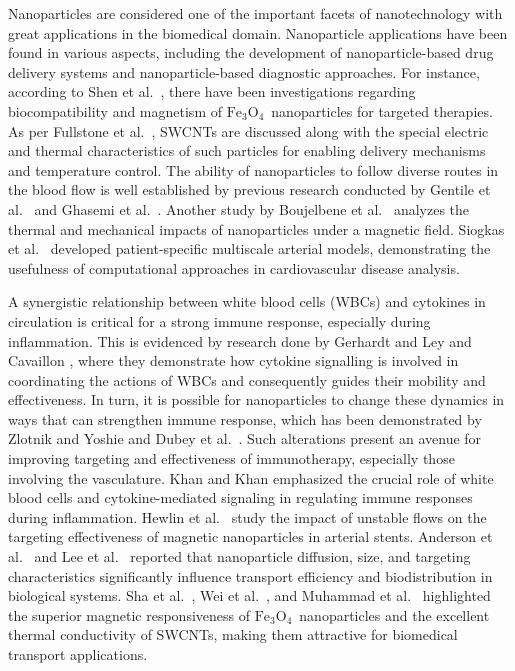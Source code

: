 \documentclass[10pt]{NSP1}
\def\feo{\ensuremath{\mathrm{Fe}_3\mathrm{O}_4}}
\begin{document}
	Nanoparticles are considered one of the important facets of nanotechnology with great applications in the biomedical domain. Nanoparticle applications have been found in various aspects, including the development of nanoparticle-based drug delivery systems and nanoparticle-based diagnostic approaches. For instance, according to Shen et al.\ \cite{Shen2018}, there have been investigations regarding biocompatibility and magnetism of \feo\ nanoparticles for targeted therapies. As per Fullstone et al.\ \cite{Fullstone2015}, SWCNTs are discussed along with the special electric and thermal characteristics of such particles for enabling delivery mechanisms and temperature control. The ability of nanoparticles to follow diverse routes in the blood flow is well established by previous research conducted by Gentile et al.\ \cite{Gentile2008} and Ghasemi et al.\ \cite{Ghasemi2015}. Another study by Boujelbene et al.\ \cite{Boujelbene2023} analyzes the thermal and mechanical impacts of nanoparticles under a magnetic field. Siogkas et al.\ \cite{Siogkas2011} developed patient-specific multiscale arterial models, demonstrating the usefulness of computational approaches in cardiovascular disease analysis.
	
	A synergistic relationship between white blood cells (WBCs) and cytokines in circulation is critical for a strong immune response, especially during inflammation. This is evidenced by research done by Gerhardt and Ley \cite{Gerhardt2015} and Cavaillon \cite{Cavaillon1994}, where they demonstrate how cytokine signalling is involved in coordinating the actions of WBCs and consequently guides their mobility and effectiveness. In turn, it is possible for nanoparticles to change these dynamics in ways that can strengthen immune response, which has been demonstrated by Zlotnik and Yoshie \cite{Zlotnik2000} and Dubey et al.\ \cite{Dubey2021}. Such alterations present an avenue for improving targeting and effectiveness of immunotherapy, especially those involving the vasculature. Khan and Khan \cite{KhanKhan2009} emphasized the crucial role of white blood cells and cytokine-mediated signaling in regulating immune responses during inflammation. Hewlin et al.\ \cite{Hewlin2023} study the impact of unstable flows on the targeting effectiveness of magnetic nanoparticles in arterial stents. Anderson et al.\ \cite{Anderson2013} and Lee et al.\ \cite{Lee2010} reported that nanoparticle diffusion, size, and targeting characteristics significantly influence transport efficiency and biodistribution in biological systems. Sha et al.\ \cite{Sha2017}, Wei et al.\ \cite{Wei2018}, and Muhammad et al.\ \cite{Muhammad2018} highlighted the superior magnetic responsiveness of \feo\ nanoparticles and the excellent thermal conductivity of SWCNTs, making them attractive for biomedical transport applications.
	
\end{document}

